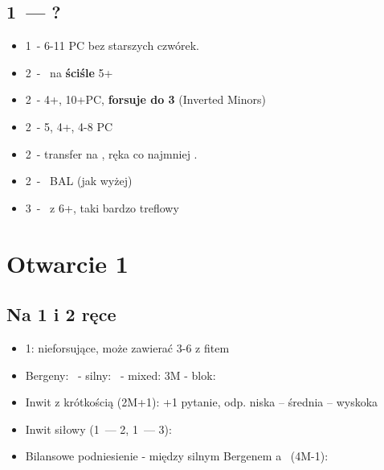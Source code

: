 \documentclass[12pt, a4paper]{article}
\begin{document}
\subsection{1\diams\ --- ?}
\begin{itemize}
    \item 1\nt\ - 6-11 PC bez starszych czwórek.
    \item 2\clubs\ - \gf\ na \textbf{ściśle} 5+\clubs
    \item 2\diams\ - 4+\diams, 10+PC, \textbf{forsuje do 3\diams} (Inverted Minors)
    \item 2\hearts\ - 5\spades, 4+\hearts, 4-8 PC
    \item 2\spades\ - transfer na \nt, ręka co najmniej \inv.
    \item 2\nt\ - \gf\ BAL (jak wyżej)
    \item 3\clubs\ - \inv\ z 6+\clubs, taki bardzo treflowy
\end{itemize}

\pagebreak


\section{Otwarcie 1\major}
\subsection{Na 1 i 2 ręce}
\begin{itemize}
    \item 1\nt: nieforsujące, może zawierać 3-6 z fitem
    \item Bergeny:
    \clubs\ - silny: 
    \diams\ - mixed: 
    \subitem 3M - blok: 
    \item Inwit z krótkością (2M+1): 
    \subitem +1 pytanie, odp. niska -- średnia -- wyskoka
    \item Inwit siłowy (1\hearts\ --- 2\nt, 1\spades\ --- 3\hearts): 
    \item Bilansowe podniesienie - między silnym Bergenem a \gf\ (4M-1): \\ 
\end{itemize}
\end{document}
